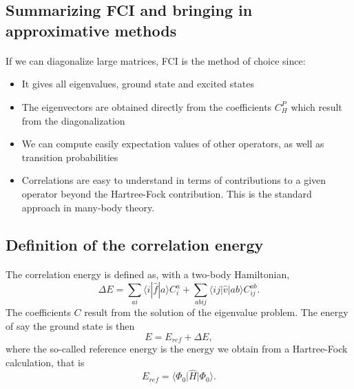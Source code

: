 \documentclass[%
oneside,                 %
final,                   %
10pt]{article}
\begin{document}
\subsection*{Summarizing FCI and bringing in approximative methods}

\paragraph{}

If we can diagonalize large matrices, FCI is the method of choice since:
\begin{itemize}
\item It gives all eigenvalues, ground state and excited states

\item The eigenvectors are obtained directly from the coefficients $C_H^P$ which result from the diagonalization

\item We can compute easily expectation values of other operators, as well as transition probabilities

\item Correlations are easy to understand in terms of contributions to a given operator beyond the Hartree-Fock contribution. This is the standard approach in  many-body theory. 
\end{itemize}

\noindent



\subsection*{Definition of the correlation energy}

\paragraph{}
The correlation energy is defined as, with a two-body Hamiltonian,  
\[
\Delta E=\sum_{ai}\langle i| \hat{f}|a \rangle C_{i}^{a}+
\sum_{abij}\langle ij | \hat{v}| ab \rangle C_{ij}^{ab}.
\]
The coefficients $C$ result from the solution of the eigenvalue problem. 
The energy of say the ground state is then
\[
E=E_{ref}+\Delta E,
\]
where the so-called reference energy is the energy we obtain from a Hartree-Fock calculation, that is
\[
E_{ref}=\langle \Phi_0 \vert \hat{H} \vert \Phi_0 \rangle.
\]
\end{document}
